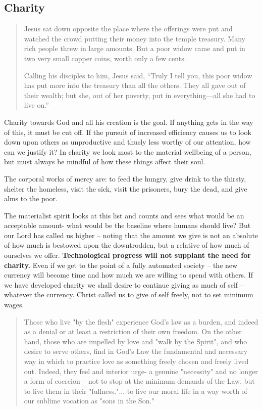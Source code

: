 \documentclass[letterpaper]{article}
\begin{document}
  \subsection{Charity}

    \begin{quote}
      Jesus sat down opposite the place where the offerings were put and watched the crowd putting their money into the temple treasury. Many rich people threw in large amounts. But a poor widow came and put in two very small copper coins, worth only a few cents.

      Calling his disciples to him, Jesus said, “Truly I tell you, this poor widow has put more into the treasury than all the others. They all gave out of their wealth; but she, out of her poverty, put in everything—all she had to live on.”
    \end{quote}

    Charity towards God and all his creation is the goal. If anything gets in the way of this, it must be cut off. If the pursuit of increased efficiency causes us to look down upon others as unproductive and thusly less worthy of our attention, how can we justify it? In charity we look most to the material wellbeing of a person, but must always be mindful of how these things affect their soul.

    The corporal works of mercy are: to feed the hungry, give drink to the thirsty, shelter the homeless, visit the sick, visit the prisoners, bury the dead, and give alms to the poor.

    The materialist spirit looks at this list and counts and sees what would be an acceptable amount- what would be the baseline where humans should live? But our Lord has called us higher -- noting that the amount we give is not an absolute of how much is bestowed upon the downtrodden, but a relative of how much of ourselves we offer. \textbf{Technological progress will not supplant the need for charity.} Even if we get to the point of a fully automated society -- the new currency will become time and how much we are willing to spend with others. If we have developed charity we shall desire to continue giving as much of self -- whatever the currency. Christ called us to give of self freely, not to set minimum wages.

    \begin{quote}
      Those who live "by the flesh" experience God's law as a burden, and indeed as a denial or at least a restriction of their own freedom. On the other hand, those who are impelled by love and "walk by the Spirit", and who desire to serve others, find in God's Law the fundamental and necessary way in which to practice love as something freely chosen and freely lived out. Indeed, they feel and interior urge- a genuine "necessity" and no longer a form of coercion -- not to stop at the minimum demands of the Law, but to live them in their "fullness."... to live our moral life in a way worth of our sublime vocation as "sons in the Son."
    \end{quote}
\end{document}
